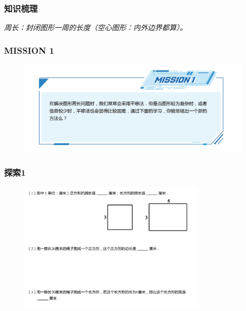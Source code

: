 \begin{frame}
    \frametitle{知识梳理}
    \vspace*{-2cm}
    \textit{周长：封闭图形一周的长度（空心图形：内外边界都算）。}
\end{frame}

\begin{frame}
    \frametitle{MISSION 1}
    \begin{figure}[H] 
        \centering
        \includegraphics[width=1\textwidth]{./pics/Chapter_1/mission1.png}
    \end{figure}
\end{frame}

\begin{frame}
    \frametitle{探索1}
    \begin{figure}[H] 
        \centering
        \includegraphics[width=0.8\textwidth]{./pics/Chapter_1/tansuo1.png}
    \end{figure}
\end{frame}

